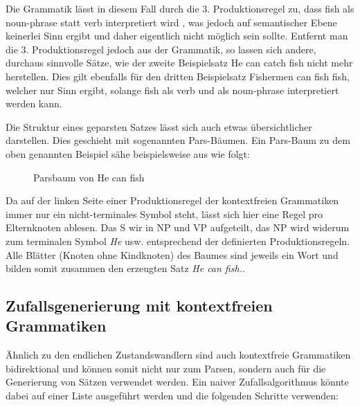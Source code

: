 \documentclass[12pt]{report}
\begin{document}
Die Grammatik lässt in diesem Fall durch die 3. Produktionsregel zu, dass \glqq  fish\grqq{} als noun-phrase statt verb interpretiert wird , was jedoch auf semantischer Ebene keinerlei Sinn ergibt und daher eigentlich nicht möglich sein sollte. Entfernt man die 3. Produktionsregel jedoch aus der Grammatik, so lassen sich andere, durchaus sinnvolle Sätze, wie der zweite Beispielsatz \glqq  He can catch fish\grqq{} nicht mehr herstellen. Dies gilt ebenfalls für den dritten Beispielsatz \glqq  Fishermen can fish fish\grqq{}, welcher nur Sinn ergibt, solange \glqq  fish\grqq{} als verb und als noun-phrase interpretiert werden kann.

Die Struktur eines geparsten Satzes lässt sich auch etwas übersichtlicher darstellen. Dies geschieht mit sogenannten Pars-Bäumen. Ein Pars-Baum zu dem oben genannten Beispiel sähe beispielsweise aus wie folgt:
\begin{figure}
\begin{center}
\caption{Parsbaum von \glqq  He can fish\grqq{}}
\end{center}
\end{figure}

Da auf der linken Seite einer Produktionsregel der kontextfreien Grammatiken immer nur ein nicht-terminales Symbol steht, lässt sich hier eine Regel pro Elternknoten ablesen. Das S wir in NP und VP aufgeteilt, das NP wird widerum zum terminalen Symbol \textit{\glqq  He\grqq{}} usw. entsprechend der definierten Produktionsregeln. Alle Blätter (Knoten ohne Kindknoten) des Baumes sind jeweils ein Wort und bilden somit zusammen den erzeugten Satz \textit{\glqq  He can fish.\grqq{}}. 

\subsection{Zufallsgenerierung mit kontextfreien Grammatiken}

Ähnlich zu den endlichen Zustandswandlern sind auch kontextfreie Grammatiken bidirektional und können somit nicht nur zum Parsen, sondern auch für die Generierung von Sätzen verwendet werden. 
Ein naiver Zufallsalgorithmus könnte dabei auf einer Liste ausgeführt werden und die folgenden Schritte verwenden:
\end{document}
